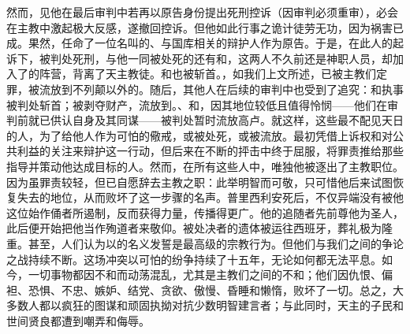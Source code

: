 然而，见他在最后审判中若再以原告身份提出死刑控诉（因审判必须重审），必会在主教中激起极大反感，遂撤回控诉。但他如此行事之诡计徒劳无功，因为祸害已成。\newline{}果然，任命了一位名叫的、与国库相关的辩护人作为原告。于是，在此人的起诉下，被判处死刑，与他一同被处死的还有和，这两人不久前还是神职人员，却加入了的阵营，背离了天主教徒。和也被斩首。，如我们上文所述，已被主教们定罪，被流放到不列颠以外的。随后，其他人在后续的审判中也受到了追究：和执事被判处斩首；被剥夺财产，流放到。、和，因其地位较低且值得怜悯——他们在审判前就已供认自身及其同谋——被判处暂时流放高卢。就这样，这些最不配见天日的人，为了给他人作为可怕的儆戒，或被处死，或被流放。\newline{}最初凭借上诉权和对公共利益的关注来辩护这一行动，但后来在不断的抨击中终于屈服，将罪责推给那些指导并策动他达成目标的人。然而，在所有这些人中，唯独他被逐出了主教职位。因为虽罪责较轻，但已自愿辞去主教之职：此举明智而可敬，只可惜他后来试图恢复失去的地位，从而败坏了这一步骤的名声。\newline{}普里西利安死后，不仅异端没有被他这位始作俑者所遏制，反而获得力量，传播得更广。他的追随者先前尊他为圣人，此后便开始把他当作殉道者来敬仰。被处决者的遗体被运往西班牙，葬礼极为隆重。甚至，人们认为以的名义发誓是最高级的宗教行为。但他们与我们之间的争论之战持续不断。这场冲突以可怕的纷争持续了十五年，无论如何都无法平息。如今，一切事物都因不和而动荡混乱，尤其是主教们之间的不和；他们因仇恨、偏袒、恐惧、不忠、嫉妒、结党、贪欲、傲慢、昏睡和懒惰，败坏了一切。总之，大多数人都以疯狂的图谋和顽固执拗对抗少数明智建言者；与此同时，天主的子民和世间贤良都遭到嘲弄和侮辱。\par

